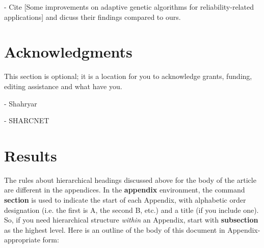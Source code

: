 \documentclass{sig-alternate}
\begin{document}
- Cite [Some improvements on adaptive genetic algorithms for reliability-related applications] and dicuss their findings compared to ours.

\begin{flushleft}\end{flushleft}



\section{Acknowledgments}
This section is optional; it is a location for you
to acknowledge grants, funding, editing assistance and
what have you.

- Shahryar

- SHARCNET


%

%
%

\appendix
\section{Results}
The rules about hierarchical headings discussed above for
the body of the article are different in the appendices.
In the \textbf{appendix} environment, the command
\textbf{section} is used to
indicate the start of each Appendix, with alphabetic order
designation (i.e. the first is A, the second B, etc.) and
a title (if you include one).  So, if you need
hierarchical structure
\textit{within} an Appendix, start with \textbf{subsection} as the
highest level. Here is an outline of the body of this
document in Appendix-appropriate form:
\end{document}
